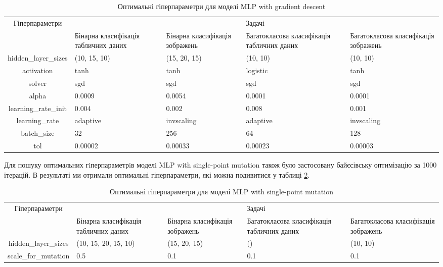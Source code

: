 \begin{table}[ht]
	\centering
	\begin{adjustbox}{max width=\textwidth}
		\begin{tabular}{|c|p{3cm}|p{3cm}|p{3cm}|p{3cm}|}
			\hline \multirow{2}{*}{Гіперпараметри} & \multicolumn{4}{c|}{Задачі} \\
			\cline{2-5} & Бінарна класифікація табличних даних & Бінарна класифікація зображень & Багатокласова класифікація табличних даних & Багатокласова класифікація зображень \\
			\hline hidden\_layer\_sizes & (10, 15, 10) & (15, 20, 15) & (10, 10) & (10, 10) \\
			\hline activation & tanh & tanh & logistic & tanh \\
			\hline solver & sgd & sgd & sgd & sgd \\
			\hline alpha & 0.0009 & 0.0054 & 0.0001 & 0.0001 \\
			\hline learning\_rate\_init & 0.004 & 0.002 & 0.008 & 0.001 \\
			\hline learning\_rate & adaptive & invscaling & adaptive & invscaling \\
			\hline batch\_size & 32 & 256 & 64 & 128 \\
			\hline tol & 0.00002 & 0.00033 & 0.00023 & 0.00003 \\
			\hline
		\end{tabular}
	\end{adjustbox}
	\caption{Оптимальні гіперпараметри для моделі MLP with gradient descent}
	\label{tab_hyperparameters_for_mlp_with_gd}
\end{table}

Для пошуку оптимальних гiперпараметрiв моделi MLP with single-point mutation також було застосовану байєсівську оптимізацію за 1000 ітерацій. В результаті ми отримали оптимальні гіперпараметри, які можна подивитися у таблиці \ref{tab_hyperparameters_for_mlp_with_sp_mut}.

\begin{table}[ht]
	\centering
	\begin{adjustbox}{max width=\textwidth}
		\begin{tabular}{|c|p{3cm}|p{3cm}|p{3cm}|p{3cm}|}
			\hline \multirow{2}{*}{Гіперпараметри} & \multicolumn{4}{c|}{Задачі} \\
			\cline{2-5} & Бінарна класифікація табличних даних & Бінарна класифікація зображень & Багатокласова класифікація табличних даних & Багатокласова класифікація зображень \\
			\hline hidden\_layer\_sizes & (10, 15, 20, 15, 10) & (15, 20, 15) & () & (10, 10) \\
			\hline scale\_for\_mutation & 0.5 & 0.1 & 0.1 & 0.1 \\
			\hline
		\end{tabular}
	\end{adjustbox}
	\caption{Оптимальні гіперпараметри для моделі MLP with single-point mutation}
	\label{tab_hyperparameters_for_mlp_with_sp_mut}
\end{table}

